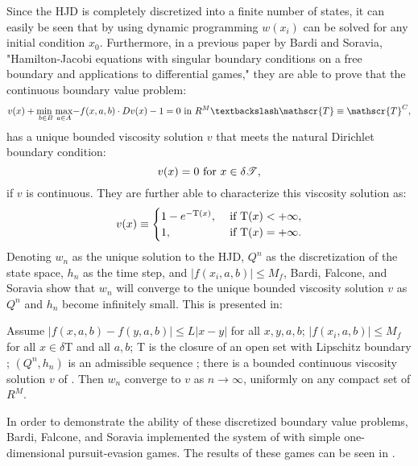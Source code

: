 Since the HJD is completely discretized into a finite number of states, it can easily be seen that by using dynamic programming $w(x_i)$ can be solved for any initial condition $x_0$. Furthermore, in a previous paper by Bardi and Soravia, "Hamilton-Jacobi equations with singular boundary conditions on a free boundary and applications to differential games,"\cite{bardi1} they are able to prove that the continuous boundary value problem:
\begin{equation}\label{eqn1}
v(x) + \underset{b \in B }{\operatorname{min \textnormal{ }}}\underset{a \in A}{\operatorname{max}}{-f(x,a,b)\cdot Dv(x)-1}=0 \textnormal{ in } R^M\textbackslash \mathscr{T} \equiv \mathscr{T}^C,
\end{equation}
has a unique bounded viscosity solution $v$ that meets the natural Dirichlet boundary condition:
\begin{equation}\label{eqn2}
v(x) = 0 \textnormal{ for } x \in \delta \mathscr{T},
\end{equation}
if $v$ is continuous. They are further able to characterize this viscosity solution as:
\begin{equation}\label{eqn3}
v(x) \equiv 
\begin{cases}
1-e^{-\textnormal{T}(x)}, & \textnormal{ if T}(x) < + \infty,\\
1, & \textnormal{ if T}(x) = + \infty.
\end{cases}
\end{equation}
Denoting $w_n$ as the unique solution to the HJD, $Q^n$ as the discretization of the state space, $h_n$ as the time step, and $|f(x_i,a,b)| \leq M_f$, Bardi, Falcone, and Soravia show that $w_n$ will converge to the unique bounded viscosity solution $v$ as $Q^n$ and $h_n$ become infinitely small. This is presented in: 
\begin{theorem}\label{dbvpt}
Assume $|f(x,a,b)-f(y,a,b)| \leq L|x-y|$ for all $x,y,a,b$; $|f(x_i,a,b)| \leq M_f$ for all $x \in \delta$T and all $a,b$; T is the closure of an open set with Lipschitz boundary ; $(Q^n,h_n)$ is an admissible sequence ; there is a bounded continuous viscosity solution $v$ of . Then $w_n$ converge to $v$ as $n \rightarrow \infty$, uniformly on any compact set of $R^M$.   
\end{theorem}
In order to demonstrate the ability of these discretized boundary value problems, Bardi, Falcone, and Soravia implemented the system of  with simple one-dimensional pursuit-evasion games. The results of these games can be seen in  \cite{bardi2}.
